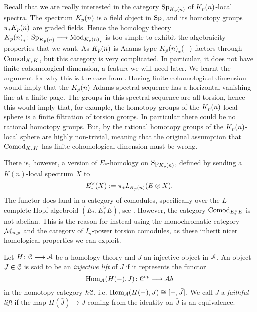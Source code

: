 \begin{remark}
    Recall that we are really interested in the category $\mathrm{Sp}_{{K_p(n)}}$ of ${K_p(n)}$-local spectra. The spectrum ${K_p(n)}$ is a field object in $\mathrm{Sp}$, and its homotopy groups $\pi_* {K_p(n)}$ are graded fields. Hence the homology theory ${K_p(n)}_*\colon \mathrm{Sp}_{{K_p(n)}}\longrightarrow \mathrm{Mod}_{{K_p(n)}_*}$ is too simple to exhibit the algebraicity properties that we want. As ${K_p(n)}$ is Adams type ${K_p(n)}_*(-)$ factors through $\mathrm{Comod}_{K_*K}$, but this category is very complicated. In particular, it does not have finite cohomological dimension, a feature we will need later. We learnt the argument for why this is the case from \cite{barthel-pstragowski_2021}. Having finite cohomological dimension would imply that the ${K_p(n)}$-Adams spectral sequence has a horizontal vanishing line at a finite page. The groups in this spectral sequence are all torsion, hence this would imply that, for example, the homotopy groups of the ${K_p(n)}$-local sphere is a finite filtration of torsion groups. In particular there could be no rational homotopy groups. But, by \cite{barthel_schlank_stapleton_weinstein_2024} the rational homotopy groups of the ${K_p(n)}$-local sphere are highly non-trivial, meaning that the original assumption that $\mathrm{Comod}_{K_*K}$ has finite cohomological dimension must be wrong. 
    
    There is, however, a version of $E_*$-homology on $\mathrm{Sp}_{{K_p(n)}}$, defined by sending a $K(n)$-local spectrum $X$ to 
    \[E_*^\vee (X) := \pi_*L_{{K_p(n)}}(E\otimes X).\]
    The functor does land in a category of comodules, specifically over the $L$-complete Hopf algebroid $(E_*, E_*^\vee E)$, see \cite[5.3]{baker_2009}. However, the category $\mathrm{Comod}_{E_*^\vee E}$ is not abelian. This is the reason for instead using the monochromatic category $\mathcal{M}_{n,p}$ and the category of $I_n$-power torsion comodules, as these inherit nicer homological properties we can exploit. 
\end{remark}

\begin{definition}
    \label{ch1:def:faithful-lift}
    Let $H\colon \EuScript{C}\longrightarrow \EuScript{A}$ be a homology theory and $J$ an injective object in $\EuScript{A}$. An object $\bar{J}\in \EuScript{C}$ is said to be an \emph{injective lift} of $J$ if it represents the functor 
    $$\operatorname{Hom}_{\EuScript{A}}(H(-),J)\colon \EuScript{C}^{op}\longrightarrow \EuScript{A} b$$
    in the homotopy category $h \EuScript{C}$, i.e. $\operatorname{Hom}_{\EuScript{A}}(H(-),J)\cong [-,\bar{J}]$. We call $\bar{J}$ a \emph{faithful lift} if the map $H(\bar{J})\longrightarrow J$ coming from the identity on $\bar{J}$ is an equivalence. 
\end{definition}

